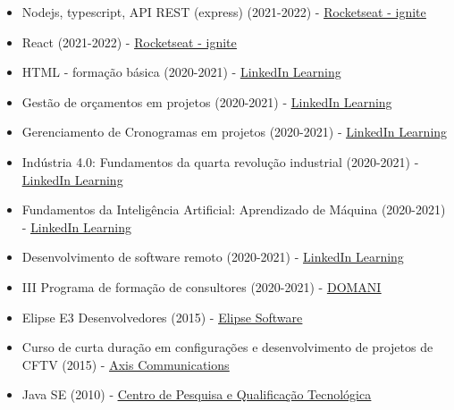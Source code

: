 \documentclass[11pt,a4paper,sans]{moderncv}
\begin{document}
\begin{samepage}
{\begin{itemize}[itemsep=0cm, label=\textbullet]
		  \item Nodejs, typescript, API REST (express) (2021-2022) - \underline{\color{blue}\href{https://rocketseat.com.br}{Rocketseat - ignite}}
		  \item React (2021-2022) - \underline{\color{blue}\href{https://rocketseat.com.br}{Rocketseat - ignite}}
		  \item HTML - formação básica (2020-2021) - \underline{\color{blue}\href{https://linkedin.com/learning}{LinkedIn Learning}}
		  \item Gestão de orçamentos em projetos (2020-2021) - \underline{\color{blue}\href{https://linkedin.com/learning}{LinkedIn Learning}}
		  \item Gerenciamento de Cronogramas em projetos (2020-2021) - \underline{\color{blue}\href{https://linkedin.com/learning}{LinkedIn Learning}}
		  \item Indústria 4.0: Fundamentos da quarta revolução industrial (2020-2021) - \underline{\color{blue}\href{https://linkedin.com/learning}{LinkedIn Learning}}
		  \item Fundamentos da Inteligência Artificial: Aprendizado de Máquina (2020-2021) - \underline{\color{blue}\href{https://linkedin.com/learning}{LinkedIn Learning}}
		  \item Desenvolvimento de software remoto (2020-2021) - \underline{\color{blue}\href{https://linkedin.com/learning}{LinkedIn Learning}}
		  \item III Programa de formação de consultores (2020-2021) - \underline{\color{blue}\href{https://domani.com.br}{DOMANI}}
		  \item Elipse E3 Desenvolvedores (2015) - \underline{\color{blue}\href{https://elipse.com}{Elipse Software}}
		  \item Curso de curta duração em configurações e desenvolvimento de projetos de CFTV (2015) - \underline{\color{blue}\href{https://axis.com}{Axis Communications}}
		  \item Java SE (2010) - \underline{\color{blue}\href{https://cpqt.com.br}{Centro de Pesquisa e Qualificação Tecnológica}}
	  \end{itemize}}
\end{samepage}
\vspace{\baselineskip}
\end{document}
